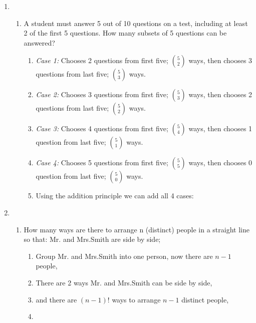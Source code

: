 \documentclass[12pt]{amsart}
\begin{document}
\begin{enumerate}
\item\begin{enumerate}
    \item  A student must answer 5 out of 10 questions on a test, including at least 2 of
the first 5 questions. How many subsets of 5 questions can be answered?
    \begin{enumerate}
        \item \emph{Case 1:} Chooses 2 questions from first five; $\binom{5}{2}$ ways, then chooses 3 questions from last five; $\binom{5}{3}$ ways.
        \item \emph{Case 2:} Chooses 3 questions from first five; $\binom{5}{3}$ ways, then chooses 2 questions from last five; $\binom{5}{2}$ ways.
        \item \emph{Case 3:} Chooses 4 questions from first five; $\binom{5}{4}$ ways, then chooses 1 question from last five; $\binom{5}{1}$ ways.
        \item \emph{Case 4:} Chooses 5 questions from first five; $\binom{5}{5}$ ways, then chooses 0 question from last five; $\binom{5}{0}$ ways.
        \item Using the addition principle we can add all 4 cases:\\
    \end{enumerate}
\end{enumerate}
\item \begin{enumerate}
    \item How many ways are there to arrange n (distinct) people in a straight line so that: Mr. and Mrs.Smith are side by side;
        \begin{enumerate}
            \item Group Mr. and Mrs.Smith into one person, now there are $n-1$ people,
            \item There are 2 ways Mr. and Mrs.Smith can be side by side,
            \item and there are $(n-1)!$ ways to arrange $n-1$ distinct people,
            \item {}
        \end{enumerate}
                

\end{enumerate}
\end{enumerate}
\end{document}
